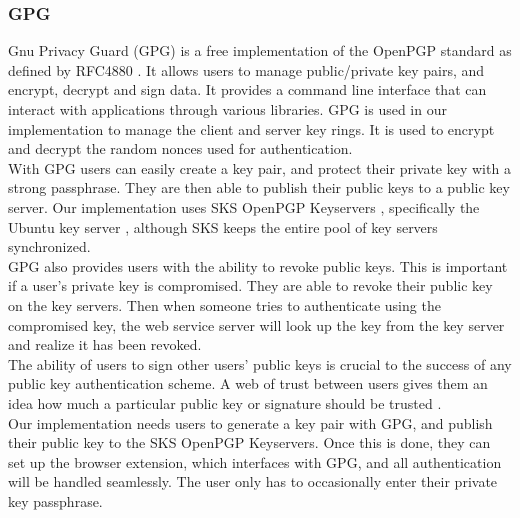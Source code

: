 \documentclass[11pt]{article}
\begin{document}
\subsubsection{GPG}
Gnu Privacy Guard (GPG) is a free implementation of the OpenPGP standard as defined by RFC4880 \cite{gpg}. It allows users to manage public/private key pairs, and encrypt, decrypt and sign data. It provides a command line interface that can interact with applications through various libraries. GPG is used in our implementation to manage the client and server key rings. It is used to encrypt and decrypt the random nonces used for authentication.\\
With GPG users can easily create a key pair, and protect their private key with a strong passphrase. They are then able to publish their public keys to a public key server. Our implementation uses SKS OpenPGP Keyservers \cite{sks}, specifically the Ubuntu key server \cite{ubuntuKey}, although SKS keeps the entire pool of key servers synchronized.\\
GPG also provides users with the ability to revoke public keys. This is important if a user's private key is compromised. They are able to revoke their public key on the key servers. Then when someone tries to authenticate using the compromised key, the web service server will look up the key from the key server and realize it has been revoked.\\
The ability of users to sign other users' public keys is crucial to the success of any public key authentication scheme. A web of trust between users gives them an idea how much a particular public key or signature should be trusted \cite{weboftrust}.\\
Our implementation needs users to generate a key pair with GPG, and publish their public key to the SKS OpenPGP Keyservers. Once this is done, they can set up the browser extension, which interfaces with GPG, and all authentication will be handled seamlessly. The user only has to occasionally enter their private key passphrase.
\end{document}
